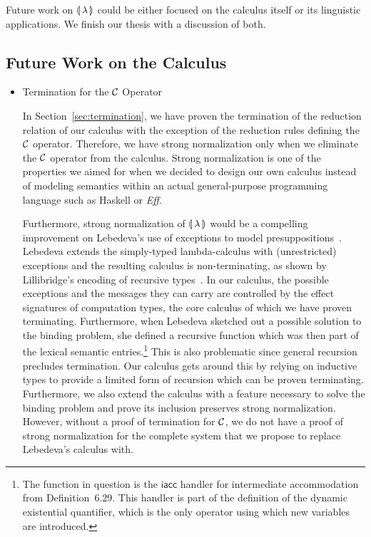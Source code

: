 Future work on ${\llparenthesis \, \lambda \, \rrparenthesis}$ could be either focused on the calculus itself or
its linguistic applications. We finish our thesis with a discussion of
both.


\subsection{Future Work on the Calculus}
\label{ssec:future-work-calculus}

\begin{itemize}
\item Termination for the $\mathcal{C}$ Operator

  In Section~\ref{sec:termination}, we have proven the termination of the
  reduction relation of our calculus with the exception of the reduction
  rules defining the $\mathcal{C}$ operator. Therefore, we have strong
  normalization only when we eliminate the $\mathcal{C}$ operator from the
  calculus. Strong normalization is one of the properties we aimed for when
  we decided to design our own calculus instead of modeling semantics
  within an actual general-purpose programming language such as Haskell or
  \emph{Eff}.

  Furthermore, strong normalization of ${\llparenthesis \, \lambda \, \rrparenthesis}$ would be a compelling
  improvement on Lebedeva's use of exceptions to model
  presuppositions~\cite{lebedeva2012expression}. Lebedeva extends the
  simply-typed lambda-calculus with (unrestricted) exceptions and the
  resulting calculus is non-terminating, as shown by Lillibridge's encoding
  of recursive types~\cite{lillibridge1995exceptions}. In our calculus, the
  possible exceptions and the messages they can carry are controlled by the
  effect signatures of computation types, the core calculus of which we
  have proven terminating. Furthermore, when Lebedeva sketched out a
  possible solution to the binding problem, she defined a recursive
  function which was then part of the lexical semantic
  entries.\footnote{The function in question is the $\textsf{iacc}$ handler
    for intermediate accommodation from Definition~6.29. This handler is
    part of the definition of the dynamic existential quantifier, which is
    the only operator using which new variables are introduced.} This is
  also problematic since general recursion precludes termination. Our
  calculus gets around this by relying on inductive types to provide a
  limited form of recursion which can be proven terminating. Furthermore,
  we also extend the calculus with a feature necessary to solve the binding
  problem and prove its inclusion preserves strong normalization. However,
  without a proof of termination for $\mathcal{C}$, we do not have a proof of
  strong normalization for the complete system that we propose to replace
  Lebedeva's calculus with.


\end{itemize}
